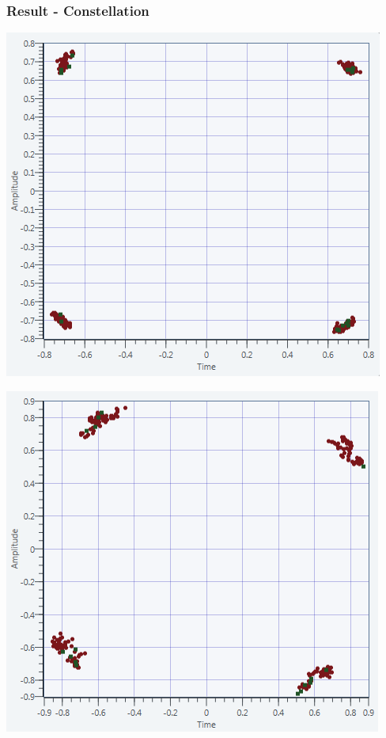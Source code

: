 \documentclass[11pt]{beamer}
\begin{document}
\begin{frame}
\frametitle{Result - Constellation}
\begin{minipage}[b]{0.48\linewidth}
        \centering \includegraphics[scale=0.37]{img/USRP_carrieroffset_227.png}
    \end{minipage}\hfill
    \begin{minipage}[b]{0.48\linewidth}
         \centering \includegraphics[scale=0.37]{img/USRP_carrieroffset_1818}
    \end{minipage}

\end{frame}
\end{document}
